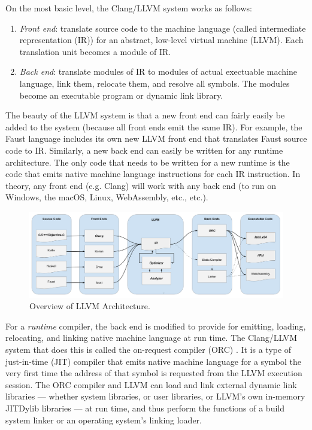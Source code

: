 \documentclass[letterpaper, 12pt]{article}
\begin{document}
On the most basic level, the Clang/LLVM system works as follows:

\begin{enumerate}
\item \textit{Front end}: translate source code to the machine language (called intermediate representation (IR)) for an abstract, low-level virtual machine (LLVM). Each translation unit becomes a module of IR.
\item \textit{Back end}: translate modules of IR to modules of actual exectuable machine language, link them, relocate them, and resolve all symbols. The modules become an executable program or dynamic link library.
\end{enumerate}

\noindent The beauty of the LLVM system is that a new front end can fairly easily be added to the system (because all front ends emit the same IR). For example, the Faust language \citep{faust} includes its own new LLVM front end that translates Faust source code to IR. Similarly, a new back end can easily be written for any runtime architecture. The only code that needs to be written for a new runtime is the code that emits native machine language instructions for each IR instruction. In theory, any front end (e.g. Clang) will work with any back end (to run on Windows, the macOS, Linux, WebAssembly, etc., etc.).

\begin{figure}[]
\begin{center}
\includegraphics[width=\textwidth,height=\textheight,keepaspectratio]{CLangLLVMArchitecture}\caption{Overview of LLVM Architecture.}
\label{fig:llvm}
\end{center}
\end{figure}

For a \textit{runtime} compiler, the back end is modified to provide for emitting, loading, relocating, and linking native machine language at run time. The Clang/LLVM system that does this is called the on-request compiler (ORC) \citep{llvmorc}. It is a type of just-in-time (JIT) compiler that emits native machine language for a symbol the very first time the address of that symbol is requested from the LLVM execution session. The ORC compiler and LLVM can load and link external dynamic link libraries --- whether system libraries, or user libraries, or LLVM's own in-memory JITDylib libraries --- at run time, and thus perform the functions of a build system linker or an operating system's linking loader. 
\end{document}
